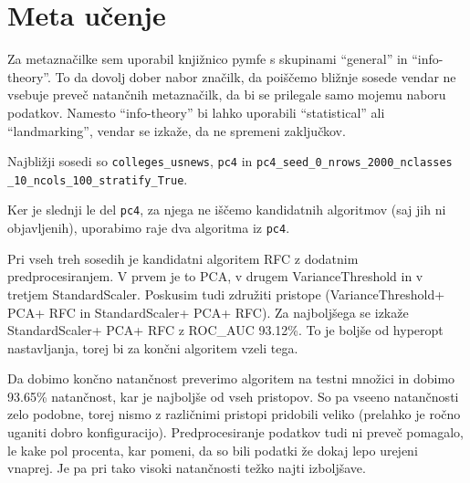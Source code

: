 \documentclass{article}
\begin{document}
\section{Meta učenje}
Za metaznačilke sem uporabil knjižnico pymfe s skupinami ``general'' in ``info-theory''. To da dovolj dober nabor značilk, da poiščemo bližnje sosede vendar ne vsebuje preveč natančnih metaznačilk, da bi se prilegale samo mojemu naboru podatkov. Namesto ``info-theory'' bi lahko uporabili ``statistical'' ali ``landmarking'', vendar se izkaže, da ne spremeni zaključkov.

Najbližji sosedi so \verb|colleges_usnews|, \verb|pc4| in \texttt{pc4\_seed\_0\_nrows\_2000\_nclasses} \texttt{\_10\_ncols\_100\_stratify\_True}.

Ker je slednji le del \verb|pc4|, za njega ne iščemo kandidatnih algoritmov (saj jih ni objavljenih), uporabimo raje dva algoritma iz \verb|pc4|.

Pri vseh treh sosedih je kandidatni algoritem RFC z dodatnim predprocesiranjem. V prvem je to PCA, v drugem VarianceThreshold in v tretjem StandardScaler. Poskusim tudi združiti pristope (VarianceThreshold+ PCA+ RFC in StandardScaler+ PCA+ RFC). Za najboljšega se izkaže StandardScaler+ PCA+ RFC z ROC\_AUC 93.12\%. To je boljše od hyperopt nastavljanja, torej bi za končni algoritem vzeli tega.

Da dobimo končno natančnost preverimo algoritem na testni množici in dobimo 93.65\% natančnost, kar je najboljše od vseh pristopov. So pa vseeno natančnosti zelo podobne, torej nismo z različnimi pristopi pridobili veliko (prelahko je ročno uganiti dobro konfiguracijo). Predprocesiranje podatkov tudi ni preveč pomagalo, le kake pol procenta, kar pomeni, da so bili podatki že dokaj lepo urejeni vnaprej. Je pa pri tako visoki natančnosti težko najti izboljšave.
\end{document}
